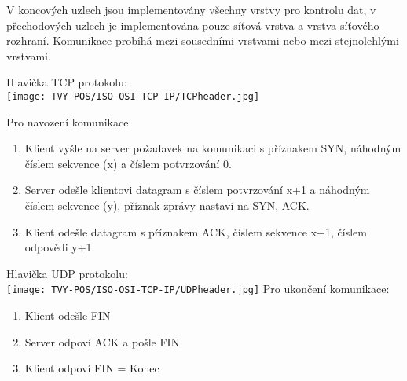     V koncových uzlech jsou implementovány všechny vrstvy pro kontrolu dat, v přechodových uzlech je implementována pouze síťová vrstva a vrstva síťového rozhraní.
    Komunikace probíhá mezi sousedními vrstvami nebo mezi stejnolehlými vrstvami.
    \begin{multicols}{2}
      Hlavička TCP protokolu: \\
      \texttt{[image: TVY-POS/ISO-OSI-TCP-IP/TCPheader.jpg]}
      \columnbreak
      
      Pro navození komunikace
      \begin{enumerate}
        \item Klient vyšle na server požadavek na komunikaci s příznakem SYN, náhodným číslem sekvence (x) a číslem potvrzování 0.
        \item Server odešle klientovi datagram s číslem potvrzování x+1 a náhodným číslem sekvence (y), příznak zprávy nastaví na SYN, ACK.
        \item Klient odešle datagram s příznakem ACK, číslem sekvence x+1, číslem odpovědi y+1.
      \end{enumerate}
    \end{multicols}
    \begin{multicols}{2}
        Hlavička UDP protokolu: \\
        \texttt{[image: TVY-POS/ISO-OSI-TCP-IP/UDPheader.jpg]}
        \columnbreak
        \newline
        Pro ukončení komunikace:
        \begin{enumerate}
          \item Klient odešle FIN
          \item Server odpoví ACK a pošle FIN
          \item Klient odpoví FIN = Konec
        \end{enumerate}
      \end{multicols}

